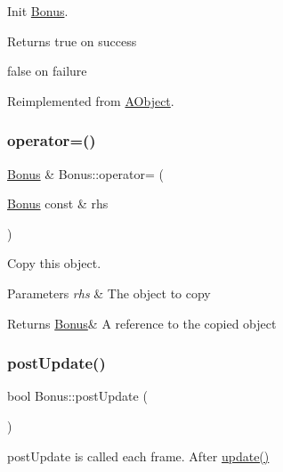 Init \hyperlink{class_bonus}{Bonus}. 

\begin{DoxyReturn}{Returns}
true on success 

false on failure 
\end{DoxyReturn}


Reimplemented from \hyperlink{class_a_object_afa83ef1c900a47453524219788327b86}{A\+Object}.

\mbox{\label{class_bonus_a739b5ec5b1e7214fd0398e4a7970529e}} 
\subsubsection{\texorpdfstring{operator=()}{operator=()}}
{\footnotesize\ttfamily \hyperlink{class_bonus}{Bonus} \& Bonus\+::operator= (\begin{DoxyParamCaption}\item[{\hyperlink{class_bonus}{Bonus} const \&}]{rhs }\end{DoxyParamCaption})}



Copy this object. 


\begin{DoxyParams}{Parameters}
{\em rhs} & The object to copy \\
\hline
\end{DoxyParams}
\begin{DoxyReturn}{Returns}
\hyperlink{class_bonus}{Bonus}\& A reference to the copied object 
\end{DoxyReturn}
\mbox{\label{class_bonus_a6524cf732f98dfc3baa7f41bbdf13b11}} 
\subsubsection{\texorpdfstring{post\+Update()}{postUpdate()}}
{\footnotesize\ttfamily bool Bonus\+::post\+Update (\begin{DoxyParamCaption}{ }\end{DoxyParamCaption})\hspace{0.3cm}{\ttfamily [virtual]}}



post\+Update is called each frame. After \hyperlink{class_bonus_a0dd8aa4474c3d1ef494ed8a916cc16cd}{update()} 

